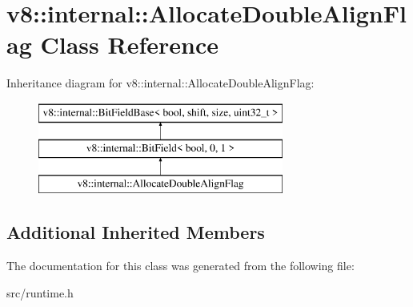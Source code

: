 \hypertarget{classv8_1_1internal_1_1_allocate_double_align_flag}{}\section{v8\+:\+:internal\+:\+:Allocate\+Double\+Align\+Flag Class Reference}
\label{classv8_1_1internal_1_1_allocate_double_align_flag}
Inheritance diagram for v8\+:\+:internal\+:\+:Allocate\+Double\+Align\+Flag\+:\begin{figure}[H]
\begin{center}
\leavevmode
\includegraphics[height=3.000000cm]{classv8_1_1internal_1_1_allocate_double_align_flag}
\end{center}
\end{figure}
\subsection*{Additional Inherited Members}


The documentation for this class was generated from the following file\+:\begin{DoxyCompactItemize}
\item 
src/runtime.\+h\end{DoxyCompactItemize}
